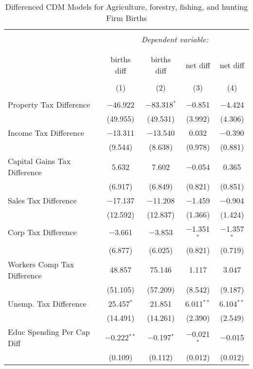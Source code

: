 
\begin{table}[!htbp] \centering 
  \caption{Differenced CDM Models for  Agriculture, forestry, fishing, and hunting Firm Births} 
  \label{} 
\begin{tabular}{@{\extracolsep{5pt}}lcccc} 
\\[-1.8ex]\hline 
\hline \\[-1.8ex] 
 & \multicolumn{4}{c}{\textit{Dependent variable:}} \\ 
\cline{2-5} 
\\[-1.8ex] & \multicolumn{4}{c}{ } \\ 
 & births diff & births diff & net diff & net diff \\ 
\\[-1.8ex] & (1) & (2) & (3) & (4)\\ 
\hline \\[-1.8ex] 
 Property Tax Difference & $-$46.922 & $-$83.318$^{*}$ & $-$0.851 & $-$4.424 \\ 
  & (49.955) & (49.531) & (3.992) & (4.306) \\ 
  Income Tax Difference & $-$13.311 & $-$13.540 & 0.032 & $-$0.390 \\ 
  & (9.544) & (8.638) & (0.978) & (0.881) \\ 
  Capital Gains Tax Difference & 5.632 & 7.602 & $-$0.054 & 0.365 \\ 
  & (6.917) & (6.849) & (0.821) & (0.851) \\ 
  Sales Tax Difference & $-$17.137 & $-$11.208 & $-$1.459 & $-$0.904 \\ 
  & (12.592) & (12.837) & (1.366) & (1.424) \\ 
  Corp Tax Difference & $-$3.661 & $-$3.853 & $-$1.351$^{*}$ & $-$1.357$^{*}$ \\ 
  & (6.877) & (6.025) & (0.821) & (0.719) \\ 
  Workers Comp Tax Difference & 48.857 & 75.146 & 1.117 & 3.047 \\ 
  & (51.105) & (57.209) & (8.542) & (9.187) \\ 
  Unemp. Tax Difference & 25.457$^{*}$ & 21.851 & 6.011$^{**}$ & 6.104$^{**}$ \\ 
  & (14.491) & (14.261) & (2.390) & (2.549) \\ 
  Educ Spending Per Cap Diff & $-$0.222$^{**}$ & $-$0.197$^{*}$ & $-$0.021$^{*}$ & $-$0.015 \\ 
  & (0.109) & (0.112) & (0.012) & (0.012) \\ 

\end{tabular}
\end{table}
